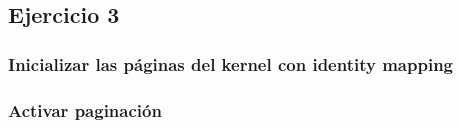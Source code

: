 \subsection{Ejercicio 3}

\subsubsection{Inicializar las páginas del kernel con identity mapping}

\subsubsection{Activar paginación}

